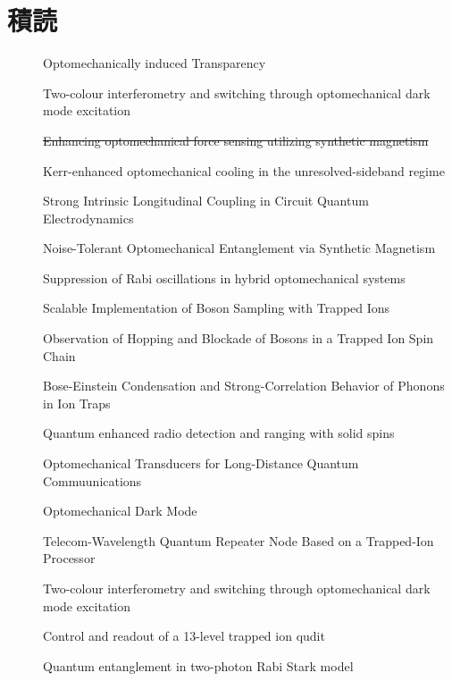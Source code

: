 \documentclass{report}
\begin{document}
  \chapter*{積読}
    \begin{description}
      \item[\cite{science.1195596}] Optomechanically induced Transparency
      \item[\cite{lake2020two}] Two-colour interferometry and switching through optomechanical dark mode excitation
      \item[\cite{PhysRevA.111.053508}] \sout{Enhancing optomechanical force sensing utilizing synthetic magnetism}
      \item[\cite{PhysRevA.111.053505}] Kerr-enhanced optomechanical cooling in the unresolved-sideband regime
      \item[\cite{PhysRevLett.134.153603}] Strong Intrinsic Longitudinal Coupling in Circuit Quantum Electrodynamics
      \item[\cite{PhysRevLett.129.063602}] Noise-Tolerant Optomechanical Entanglement via Synthetic Magnetism
      \item[\cite{PhysRevA.92.043822}] Suppression of Rabi oscillations in hybrid optomechanical systems
      \item[\cite{PhysRevLett.112.050504}] Scalable Implementation of Boson Sampling with Trapped Ions
      \item[\cite{PhysRevLett.120.073001}] Observation of Hopping and Blockade of Bosons in a Trapped Ion Spin Chain
      \item[\cite{PhysRevLett.93.263602}] Bose-Einstein Condensation and Strong-Correlation Behavior of Phonons in Ion Traps
      \item[\cite{chen2023quantum}] Quantum enhanced radio detection and ranging with solid spins
      \item[\cite{PhysRevLett.105.220501}] Optomechanical Transducers for Long-Distance Quantum Commuunications
      \item[\cite{science.1228370}] Optomechanical Dark Mode
      \item[\cite{PhysRevLett.130.213601}] Telecom-Wavelength Quantum Repeater Node Based on a Trapped-Ion Processor
      \item[\cite{lake2020two}] Two-colour interferometry and switching through optomechanical dark mode excitation
      \item[\cite{low2025control}] Control and readout of a 13-level trapped ion qudit 
      \item[\cite{boutakka2025quantum}] Quantum entanglement in two-photon Rabi Stark model
    \end{description}
  \printbibliography
\end{document}
